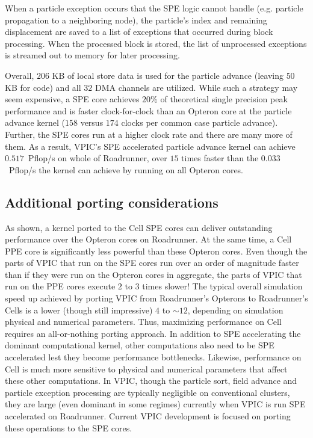 \documentclass[10pt]{article}
\begin{document}
When a particle exception occurs that the SPE logic cannot handle
(e.g. particle propagation to a neighboring node), the
particle's index and remaining displacement are saved to a list of
exceptions that occurred during block processing.  When the processed
block is stored, the list of unprocessed exceptions
is streamed out to memory for later processing.


Overall, $206$ KB of local store data is used for the particle advance
(leaving $50$ KB for code) and all $32$ DMA channels are utilized.
While such a strategy may seem expensive, a SPE core achieves $20\%$
of theoretical single precision peak performance and is faster
clock-for-clock than an Opteron core at the particle advance kernel
($158$ versus $174$ clocks per common case particle advance).  Further, 
the SPE cores run at a higher clock rate and there are many more of
them.  As a result, VPIC's SPE accelerated particle advance kernel can
achieve $0.517$~Pflop/s on whole of Roadrunner, over $15$ times faster
than the $0.033$~Pflop/s the kernel can achieve by running on all
Opteron cores.

\subsection{Additional porting considerations}

As shown, a kernel ported to the Cell SPE cores can deliver
outstanding performance over the Opteron cores on Roadrunner.  At the
same time, a Cell PPE core is significantly less powerful than these
Opteron cores.  Even though the parts of VPIC that run on the SPE
cores run over an order of magnitude faster than if they were run on
the Opteron cores in aggregate, the parts of VPIC that run on the PPE
cores execute $2$ to $3$ times slower!  The typical overall
simulation speed up achieved by porting VPIC from Roadrunner's
Opterons to Roadrunner's Cells is a lower (though still impressive)
$4$ to $\sim 12$, depending on simulation physical and numerical
parameters.  Thus, maximizing performance on Cell requires an
all-or-nothing porting approach.  In addition to SPE accelerating the
dominant computational kernel, other computations also need to be SPE
accelerated lest they become performance bottlenecks.  Likewise,
performance on Cell is much more sensitive to physical and numerical
parameters that affect these other computations.  In VPIC, though the
particle sort, field advance and particle exception processing are
typically negligible on conventional clusters, they are large (even
dominant in some regimes) currently when VPIC is run SPE accelerated
on Roadrunner.  Current VPIC development is focused on porting these
operations to the SPE cores.
\end{document}
